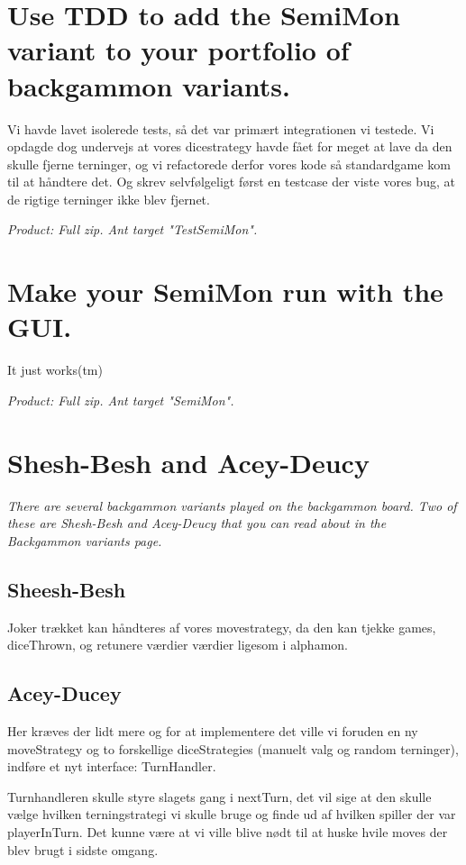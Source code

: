 \documentclass[a4paper]{article}
\begin{document}
\lhead{}
\rhead{}

\section{Use TDD to add the SemiMon variant to your portfolio of backgammon variants.}

Vi havde lavet isolerede tests, så det var primært integrationen vi
testede. Vi opdagde dog undervejs at vores dicestrategy havde fået for
meget at lave da den skulle fjerne terninger, og vi refactorede derfor
vores kode så standardgame kom til at håndtere det. Og skrev
selvfølgeligt først en testcase der viste vores bug, at de rigtige
terninger ikke blev fjernet.

\textit{Product: Full zip. Ant target "TestSemiMon".}

\section{ Make your SemiMon run with the GUI.}
It just works(tm)

\textit{Product: Full zip. Ant target "SemiMon".}

\section{Shesh-Besh and Acey-Deucy}

\textit{ There are several backgammon variants played on the
  backgammon board. Two of these are Shesh-Besh and Acey-Deucy that
  you can read about in the Backgammon variants page.}

\subsection{Sheesh-Besh}

Joker trækket kan håndteres af vores movestrategy, da den kan tjekke
games, diceThrown, og retunere værdier værdier ligesom i alphamon.

\subsection{Acey-Ducey}

Her kræves der lidt mere og for at implementere det ville vi foruden
en ny moveStrategy og to forskellige diceStrategies (manuelt valg og
random terninger), indføre et nyt interface: TurnHandler.

Turnhandleren skulle styre slagets gang i nextTurn, det vil sige at
den skulle vælge hvilken terningstrategi vi skulle bruge og finde ud
af hvilken spiller der var playerInTurn. Det kunne være at vi ville
blive nødt til at huske hvile moves der blev brugt i sidste omgang. 
\end{document}

